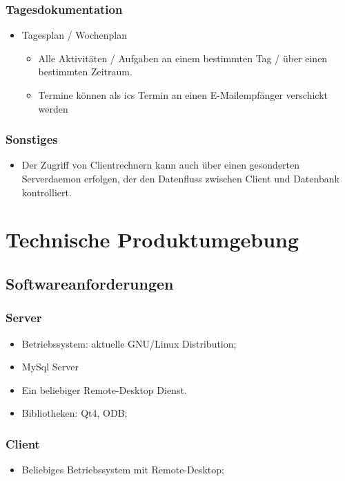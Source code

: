 \documentclass[a4paper,10pt]{article}
\begin{document}
\subsubsection{Tagesdokumentation}
\begin{itemize}
	\item Tagesplan / Wochenplan
	\begin{itemize}
		\item Alle Aktivitäten / Aufgaben an einem bestimmten Tag / über einen bestimmten Zeitraum.
		\item Termine können als ics Termin an einen E-Mailempfänger verschickt werden
	\end{itemize}
\end{itemize}
\subsubsection{Sonstiges}
\begin{itemize}
	\item Der Zugriff von Clientrechnern kann auch über einen gesonderten \label{Serverdaemon} Serverdaemon erfolgen,
	der den Datenfluss zwischen Client und Datenbank kontrolliert.
\end{itemize}


\section{Technische Produktumgebung}
\subsection{Softwareanforderungen}
\subsubsection{Server}
\begin{itemize}
	\item Betriebssystem: aktuelle GNU/Linux Distribution;
	\item MySql Server
	\item Ein beliebiger Remote-Desktop Dienst.
	\item Bibliotheken: Qt4, ODB;
\end{itemize}
\subsubsection{Client}
\begin{itemize}
	\item Beliebiges Betriebssystem mit Remote-Desktop;
\end{itemize}
\end{document}
